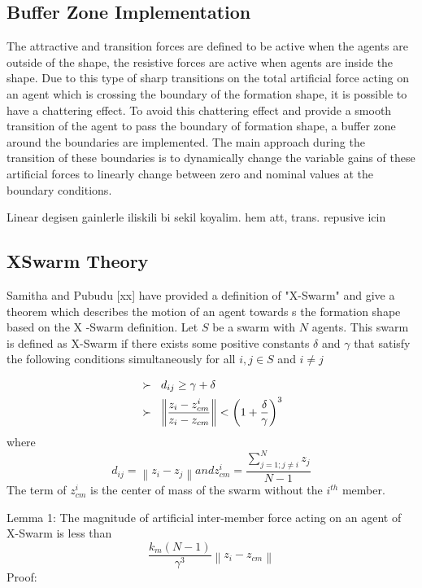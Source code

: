 \documentclass[twoside]{article}
\newcommand{\norm}[1]{\left\lVert#1\right\rVert}
\begin{document}
			
			\subsection{Buffer Zone Implementation}
			
     The attractive and transition forces are defined to be active when the agents are outside of the shape, the resistive forces are active when agents are inside the shape. Due to this type of sharp transitions on the total artificial force acting on an agent which is crossing the boundary of the formation shape, it is possible to have a chattering effect. To avoid this chattering effect and provide a smooth transition of the agent to pass the boundary of formation shape, a buffer zone around the boundaries are implemented. The main approach during the transition of these boundaries is to dynamically change the variable gains of these artificial forces to linearly change between zero and nominal values at the boundary conditions. 
     
     Linear degisen gainlerle iliskili bi sekil koyalim. hem att, trans. repusive icin
			
			\subsection{XSwarm Theory}
			
			Samitha and Pubudu [xx] have provided a definition of "X-Swarm" and give a theorem which describes the motion of an agent towards s the formation shape based on the X -Swarm definition. Let $S$ be a swarm with $N$ agents. This swarm is defined as X-Swarm if there exists some positive constants $\delta$ and  $ \gamma$ that satisfy the following conditions simultaneously for all $i,j \in S$ and $i \neq j$
			
\begin{align*}
&\succ\hspace{0.2cm}  d_{ij} \geq \gamma + \delta \\
&\succ \hspace{0.2cm}   \norm{\frac{z_i - z_{cm}^i}{z_i - z_{cm}}} < \left(1+\frac{\delta}{\gamma}\right)^3
\end{align*}
			where
\begin{equation}
 d_{ij} = \norm{z_i - z_j} and z_{cm}^i = \frac{\sum_{j=1; j\neq i}^{N} z_j}{N-1}
\end{equation}
The term of $z_{cm}^i$ is the center of mass of the swarm without the $i^{th}$ member.

Lemma 1: The magnitude of artificial inter-member force acting on an agent of X-Swarm  is less than
\begin{equation}
 \frac{k_m(N-1)}{\gamma ^3} \norm{z_i - z_{cm}}
\end{equation}
Proof:
\end{document}
